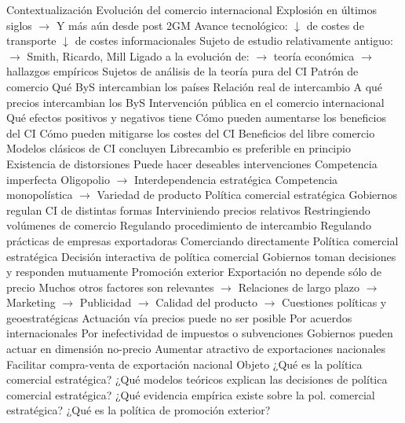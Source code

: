 \documentclass{nuevotema}
\begin{document}
\begin{esquemal}
	\1[] 
		\2 Contextualización
			\3 Evolución del comercio internacional
				\4 Explosión en últimos siglos
				\4[] $\to$ Y más aún desde post 2GM
				\4 Avance tecnológico:
				\4[] $\downarrow$ de costes de transporte
				\4[] $\downarrow$ de costes informacionales
				\4 Sujeto de estudio relativamente antiguo:
				\4[] $\to$ Smith, Ricardo, Mill
				\4[] Ligado a la evolución de:
				\4[] $\to$ teoría económica
				\4[] $\to$ hallazgos empíricos
			\3 Sujetos de análisis de la teoría pura del CI
				\4 Patrón de comercio
				\4[] Qué ByS intercambian los países
				\4 Relación real de intercambio
				\4[] A qué precios intercambian los ByS
				\4 Intervención pública en el comercio internacional
				\4[] Qué efectos positivos y negativos tiene
				\4[] Cómo pueden aumentarse los beneficios del CI
				\4[] Cómo pueden mitigarse los costes del CI
			\3 Beneficios del libre comercio
				\4 Modelos clásicos de CI concluyen
				\4[] Librecambio es preferible en principio
				\4 Existencia de distorsiones
				\4[] Puede hacer deseables intervenciones
				\4 Competencia imperfecta
				\4[] Oligopolio
				\4[] $\to$ Interdependencia estratégica
				\4[] Competencia monopolística
				\4[] $\to$ Variedad de producto
			\3 Política comercial estratégica
				\4 Gobiernos regulan CI de distintas formas
				\4[] Interviniendo precios relativos
				\4[] Restringiendo volúmenes de comercio
				\4[] Regulando procedimiento de intercambio
				\4[] Regulando prácticas de empresas exportadoras
				\4[] Comerciando directamente
				\4 Política comercial estratégica
				\4[] Decisión interactiva de política comercial
				\4[] Gobiernos toman decisiones y responden mutuamente
			\3 Promoción exterior
				\4 Exportación no depende sólo de precio
				\4[] Muchos otros factores son relevantes
				\4[] $\to$ Relaciones de largo plazo
				\4[] $\to$ Marketing
				\4[] $\to$ Publicidad
				\4[] $\to$ Calidad del producto
				\4[] $\to$ Cuestiones políticas y geoestratégicas
				\4 Actuación vía precios puede no ser posible
				\4[] Por acuerdos internacionales
				\4[] Por inefectividad de impuestos o subvenciones
				\4 Gobiernos pueden actuar en dimensión no-precio
				\4[] Aumentar atractivo de exportaciones nacionales
				\4[] Facilitar compra-venta de exportación nacional
		\2 Objeto
			\3 ¿Qué es la política comercial estratégica?
			\3 ¿Qué modelos teóricos explican las decisiones de política comercial estratégica?
			\3 ¿Qué evidencia empírica existe sobre la pol. comercial estratégica?
			\3 ¿Qué es la política de promoción exterior?

\end{esquemal}
\end{document}
